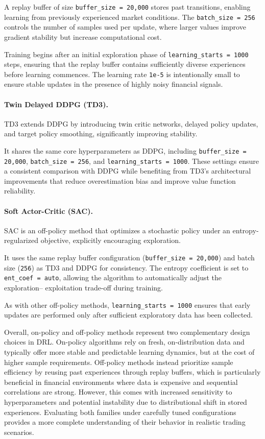 A replay buffer of size \texttt{buffer\_size = 20{,}000} stores past transitions, enabling
learning from previously experienced market conditions. The \texttt{batch\_size = 256}
controls the number of samples used per update, where larger values improve gradient stability
but increase computational cost.

Training begins after an initial exploration phase of \texttt{learning\_starts = 1000} steps,
ensuring that the replay buffer contains sufficiently diverse experiences before learning
commences. The learning rate \texttt{1e-5} is intentionally small to ensure stable updates
in the presence of highly noisy financial signals.

\paragraph{Twin Delayed DDPG (TD3).} 
TD3 extends DDPG by introducing twin critic networks, delayed policy updates, and target policy 
smoothing, significantly improving stability.

It shares the same core hyperparameters as DDPG, including \texttt{buffer\_size = 20{,}000},
\texttt{batch\_size = 256}, and \texttt{learning\_starts = 1000}. These settings ensure a
consistent comparison with DDPG while benefiting from TD3’s architectural improvements that
reduce overestimation bias and improve value function reliability.

\paragraph{Soft Actor-Critic (SAC).} 
SAC is an off-policy method that optimizes a stochastic
policy under an entropy-regularized objective, explicitly encouraging exploration.

It uses the same replay buffer configuration (\texttt{buffer\_size = 20{,}000}) and batch
size (\texttt{256}) as TD3 and DDPG for consistency. The entropy coefficient is set to
\texttt{ent\_coef = auto}, allowing the algorithm to automatically adjust the exploration–
exploitation trade-off during training.

As with other off-policy methods, \texttt{learning\_starts = 1000} ensures that early updates
are performed only after sufficient exploratory data has been collected.

Overall, on-policy and off-policy methods represent two complementary design choices in DRL.
On-policy algorithms rely on fresh, on-distribution data and typically offer more stable and
predictable learning dynamics, but at the cost of higher sample requirements. Off-policy
methods instead prioritize sample efficiency by reusing past experiences through replay buffers,
which is particularly beneficial in financial environments where data is expensive and sequential
correlations are strong. However, this comes with increased sensitivity to hyperparameters and
potential instability due to distributional shift in stored experiences. Evaluating both
families under carefully tuned configurations provides a more complete understanding of their
behavior in realistic trading scenarios.